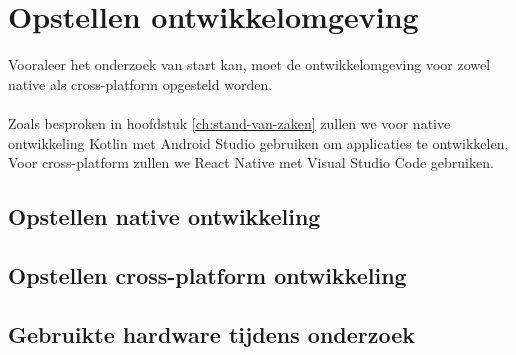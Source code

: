 
\chapter{Opstellen ontwikkelomgeving}%
\label{ch:ontwikkelomgeving}

Vooraleer het onderzoek van start kan, moet de ontwikkelomgeving voor zowel native 
als cross-platform opgesteld worden. 
\\\\
Zoals besproken in hoofdstuk \ref{ch:stand-van-zaken} zullen we voor native ontwikkeling Kotlin 
met Android Studio gebruiken om applicaties te ontwikkelen. Voor cross-platform zullen we React Native 
met Visual Studio Code gebruiken.

\section{Opstellen native ontwikkeling}\label{se:native}



\section{Opstellen cross-platform ontwikkeling}



\section{Gebruikte hardware tijdens onderzoek}












